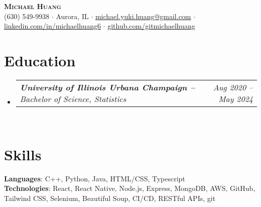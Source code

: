\documentclass[letterpaper,11pt]{article}
\makeatletter
\newcommand{\resumeSubSubheading}[2]{
    \item
    \begin{tabular*}{0.97\textwidth}{l@{\extracolsep{\fill}}r}
      \textit{\small#1} & \textit{\small #2} \\
    \end{tabular*}\vspace{-12pt}
}
\newcommand{\resumeSubHeadingListStart}{\begin{itemize}[leftmargin=0.15in, label={}]}
\newcommand{\resumeSubHeadingListEnd}{\end{itemize}}
\makeatother
\begin{document}

\begin{center}
    \textbf{\Large \scshape Michael Huang} \\ \vspace{3pt}
    \small
    {{(630) 549-9938}} $\cdot$
    {{Aurora, IL}} $\cdot$ 
    \href{mailto:michael.yuki.huang@gmail.com}{{michael.yuki.huang@gmail.com}} $\cdot$
    \href{https://linkedin.com/in/michaelhuang6}{{linkedin.com/in/michaelhuang6}} $\cdot$
    \href{https://github.com/gitmichaelhuang}{{github.com/gitmichaelhuang}}
\end{center} \vspace{-16pt}


\section{Education}
  \resumeSubHeadingListStart
    \resumeSubSubheading
      {\small \normalfont \textbf{University of Illinois Urbana Champaign --} {Bachelor of Science, Statistics}} {\small \normalfont Aug 2020 -- May 2024} \\ \vspace{8pt}
  \resumeSubHeadingListEnd

\section{Skills}
  \begin{itemize}[leftmargin=0.15in, label={}]
    \small{\item{
      \textbf{Languages}{: C++, Python, Java, HTML/CSS, Typescript} \\ \vspace{2pt}
      \textbf{Technologies}{: React, React Native, Node.js, Express, MongoDB, AWS, GitHub, Tailwind CSS, Selenium, Beautiful Soup, CI/CD, RESTful APIs, git} \\ \vspace{-6pt}
    }}
  \end{itemize}
\end{document}
